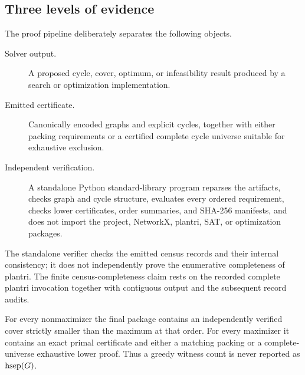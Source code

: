 \subsection{Three levels of evidence}

The proof pipeline deliberately separates the following objects.
\begin{description}
  \item[Solver output.] A proposed cycle, cover, optimum, or infeasibility
    result produced by a search or optimization implementation.
  \item[Emitted certificate.] Canonically encoded graphs and explicit cycles,
    together with either packing requirements or a certified complete cycle
    universe suitable for exhaustive exclusion.
  \item[Independent verification.] A standalone Python standard-library
    program reparses the artifacts, checks graph and cycle structure, evaluates
    every ordered requirement, checks lower certificates, order summaries, and
    SHA-256 manifests, and does not import the project, NetworkX, plantri, SAT,
    or optimization packages.
\end{description}

The standalone verifier checks the emitted census records and their internal
consistency; it does not independently prove the enumerative completeness of
plantri.  The finite census-completeness claim rests on the recorded complete
plantri invocation together with contiguous output and the subsequent record
audits.

For every nonmaximizer the final package contains an independently verified
cover strictly smaller than the maximum at that order.  For every maximizer it
contains an exact primal certificate and either a matching packing or a
complete-universe exhaustive lower proof.  Thus a greedy witness count is never
reported as \(\operatorname{hsep}(G)\).
